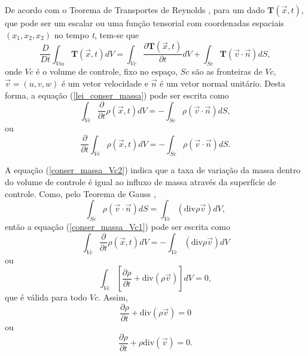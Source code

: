 De acordo com o Teorema de Transportes de Reynolds \cite{Malvern}, para um dado $\textbf{T}( \vec{x}, t)$, que pode ser um escalar ou uma função tensorial com coordenadas espaciais $(x_{1},x_{2},x_{2})$ no tempo \textit{t}, tem-se que
\begin{equation} \label{transp_Reynolds}
\dfrac{D}{Dt} \int_{Vm} \textbf{T} ( \vec{x} , t)dV =\int_{Vc} \dfrac{ \partial \textbf{T} ( \vec{x} ,t)}{ \partial t} dV + \int_{Sc} \textbf{T} ( \vec{v} \cdot \vec{n}) dS,
\end{equation}
onde $\textit{Vc}$ é o volume de controle, fixo no espaço, $\textit{Sc}$ são as fronteiras de $\textit{Vc}$, $\vec{v} = (u , v , w) $ é um vetor velocidade  e $\vec{n}$ é um vetor normal unitário. Desta forma, a equação (\ref{lei_conser_massa}) pode ser escrita como
\begin{equation} \label{conser_massa_Vc1}
\int_{Vc} \dfrac{ \partial}{\partial t} \rho (\vec{x} , t) dV= - \int_{Sc} \rho ( \vec{v} \cdot \vec{n} ) dS,
\end{equation}
ou
\begin{equation} \label{conser_massa_Vc2}
\dfrac{ \partial}{\partial t} \int_{Vc} \rho ( \vec{x} , t) dV = - \int_{Sc} \rho ( \vec{v} \cdot \vec{n} ) dS.
\end{equation}

A equação (\ref{conser_massa_Vc2}) indica que a taxa de variação da massa dentro do volume de controle é igual ao influxo de massa através da superfície de controle. Como, pelo Teorema de Gauss \cite{Lai},
\begin{equation} \label{teorema_Gauss}
\int_{Sc} \rho ( \vec{v} \cdot \vec{n} ) dS= \int_{Vc} (\mbox{div} \rho \vec{v}) dV,
\end{equation}
então a equação (\ref{conser_massa_Vc1}) pode ser escrita como
\begin{equation}
\int_{Vc} \dfrac{ \partial}{\partial t} \rho (\vec{x} , t) dV= - \int_{Vc} (\mbox{div} \rho \vec{v}) dV
\end{equation}
ou
\begin{equation} \label{integral_massa}
\int_{Vc} \left[ \dfrac{ \partial \rho}{\partial t} + \mbox{div} ( \rho \vec{v}) \right] dV = 0,
\end{equation}
que é válida para todo $Vc$. Assim,
\begin{equation} \label{eq_massa_1}
\dfrac{ \partial \rho}{\partial t} + \mbox{div} ( \rho \vec{v}) = 0
\end{equation}
ou
\begin{equation} \label{eq_massa_2}
\dfrac{ \partial \rho}{\partial t} +  \rho \mbox{div} ( \vec{v}) = 0.
\end{equation}

